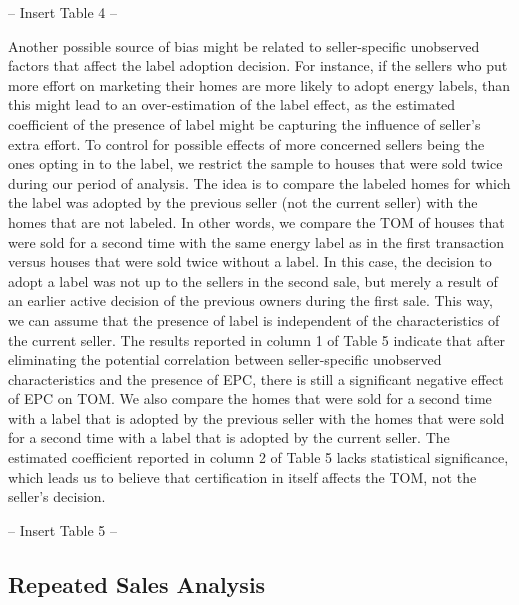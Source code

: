 \documentclass[12pt]{article}
\begin{document}
\begin{center}
-- Insert Table 4 --
\end{center}

Another possible source of bias might be related to seller-specific unobserved factors that affect the label adoption decision. For instance, if the sellers who put more effort on marketing their homes are more likely to adopt energy labels, than this might lead to an over-estimation of the label effect, as the estimated coefficient of the presence of label might be capturing the influence of seller’s extra effort. To control for possible effects of more concerned sellers being the ones opting in to the label, we restrict the sample to houses that were sold twice during our period of analysis. The idea is to compare the labeled homes for which the label was adopted by the previous seller (not the current seller) with the homes that are not labeled. In other words, we compare the TOM of houses that were sold for a second time with the same energy label as in the first transaction versus houses that were sold twice without a label. In this case, the decision to adopt a label was not up to the  sellers in the second sale, but merely a result of an earlier active decision of the previous owners during the first sale. This way, we can assume that the presence of label is independent of the characteristics of the current seller. The results reported in column 1 of Table 5 indicate that after eliminating the potential correlation between seller-specific unobserved characteristics and the presence of EPC, there is still a significant negative effect of EPC on TOM. We also compare the homes that were sold for a second time with a label that is adopted by the previous seller with the homes that were sold for a second time with a label that is adopted by the current seller. The estimated coefficient reported in column 2 of Table 5 lacks statistical significance, which leads us to believe that certification in itself affects the TOM, not the seller's decision.

\begin{center}
-- Insert Table 5 --
\end{center}
\subsection{Repeated Sales Analysis}
\end{document}
